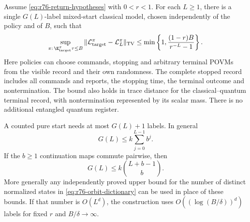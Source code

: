 \begin{theorem}
\label{thm:r76-return-approximation}
Assume \eqref{eq:r76-return-hypotheses} with $0<r<1$.
For each $L\ge1$, there is a single $G(L)$-label mixed-start classical
model, chosen independently of the policy and of $B$, such that
\begin{equation}\label{eq:r76-return-approximation}
 \sup_{\pi:\,\E_{\rm target}^{\pi}\tau\le B}
 \|\mathcal L_{\rm target}^{\pi}-\mathcal L_L^{\pi}\|_{\rm TV}
 \le \min\left\{1,\frac{(1-r)B}{r^{-L}-1}\right\}.
\end{equation}
Here policies can choose commands, stopping and arbitrary terminal POVMs
from the visible record and their own randomness.  The complete stopped
record includes all commands and reports, the stopping time, the terminal
outcome and nontermination.  The bound also holds in trace distance for
the classical--quantum terminal record, with nontermination represented
by its scalar mass.  There is no additional entangled quantum register.

A counted pure start needs at most $G(L)+1$ labels.  In general
\begin{equation}\label{eq:r76-semigroup-growth}
 G(L)\le k\sum_{j=0}^{L-1}b^j.
\end{equation}
If the $b\ge1$ continuation maps commute pairwise, then
\begin{equation}\label{eq:r76-commuting-growth}
 G(L)\le k\binom{L+b-1}{b}.
\end{equation}
More generally any independently proved upper bound for the number of
distinct normalized states in \eqref{eq:r76-orbit-dictionary} can be used
in place of these bounds.  If that number is $O(L^d)$, the construction
uses $O((\log(B/\delta))^d)$ labels for fixed $r$ and
$B/\delta\to\infty$.
\end{theorem}
